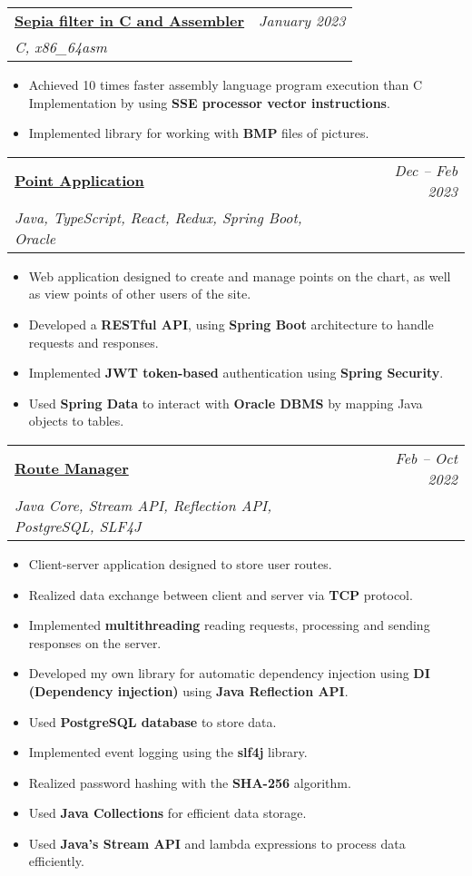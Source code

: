 \documentclass[letterpaper,11pt]{article}
\makeatletter
\newcommand{\resumeItemNoBold}[1]{
  \item\small{
    {#1 \vspace{-2pt}}
  }
}
\newcommand{\resumeSubheading}[4]{
  \vspace{-1pt}\item
    \begin{tabular*}{0.97\textwidth}[t]{l@{\extracolsep{\fill}}r}
      \textbf{#1} & #2 \\
      \textit{\small#3} & \textit{\small #4} \\
    \end{tabular*}\vspace{-5pt}
}
\newcommand{\resumeItemListStart}{\begin{itemize}}
\newcommand{\resumeItemListEnd}{\end{itemize}\vspace{-5pt}}
\makeatother
\begin{document}
    \resumeSubheading{
    \href{https://github.com/AaLexUser/ITMO-2-course/tree/main/Programming-languages/assignment-5-sepia-filter}
    {Sepia filter in C and Assembler}}{\textit{January 2023}}{C, x86\_64asm} { }
    \resumeItemListStart
      \resumeItemNoBold{Achieved 10 times faster assembly language program execution than C Implementation by using \textbf{SSE processor vector instructions}.}
      \resumeItemNoBold{Implemented library for working with \textbf{BMP} files of pictures.}
    \resumeItemListEnd

    \resumeSubheading{
    \href{https://github.com/AaLexUser/ITMO-2-course/tree/main/Web-programming/web-4}
    {Point Application}}{\textit{Dec -- Feb 2023}}{Java, TypeScript, React, Redux, Spring Boot, Oracle}{ }
    \resumeItemListStart
      \resumeItemNoBold{Web application designed to create and manage points on the chart, as well as view points of other users of the site.}
      \resumeItemNoBold{Developed a \textbf{RESTful API}, using \textbf{Spring Boot} architecture to handle requests and responses.}
      \resumeItemNoBold{Implemented \textbf{JWT token-based} authentication using \textbf{Spring Security}.}
      \resumeItemNoBold{Used \textbf{Spring Data} to interact with \textbf{Oracle DBMS} by mapping Java objects to tables.}
    \resumeItemListEnd

\resumeSubheading{
    \href{https://github.com/AaLexUser/Route-manager-application}
    {Route Manager}}{\textit{Feb -- Oct 2022}}{Java Core, Stream API, Reflection API, PostgreSQL, SLF4J}{ }
    \resumeItemListStart
      \resumeItemNoBold{Client-server application designed to store user routes.}
      \resumeItemNoBold{Realized data exchange between client and server via \textbf{TCP} protocol.}
      \resumeItemNoBold{Implemented \textbf{multithreading} reading requests, processing and sending responses on the server.}
      \resumeItemNoBold{Developed my own library for automatic dependency injection using \textbf{DI (Dependency injection)} using \textbf{Java Reflection API}.}
      \resumeItemNoBold{Used \textbf{PostgreSQL database} to store data.}
      \resumeItemNoBold{Implemented event logging using the \textbf{slf4j} library.}
      \resumeItemNoBold{Realized password hashing with the \textbf{SHA-256} algorithm.}
      \resumeItemNoBold{Used \textbf{Java Collections} for efficient data storage.}
      \resumeItemNoBold{Used \textbf{Java's Stream API} and lambda expressions to process data efficiently.}


    \resumeItemListEnd
\end{document}
